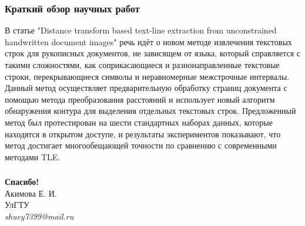 \documentclass[
	fullscreen=true, 
	bookmarks=false,
	sans serif,
	9pt,
	pdf,
	hyperref={
		pdfpagelabels=false,
		unicode=true
	}
]{beamer}
\begin{document}
	\begin{frame}[fragile]\frametitle{Краткий обзор научных работ}	
        В статье "Distance transform based text-line extraction from unconstrained handwritten document images" речь идёт о новом методе извлечения текстовых строк для рукописных документов, не зависящем от языка, который справляется с такими сложностями, как соприкасающиеся и разнонаправленные текстовые строки, перекрывающиеся символы и неравномерные межстрочные интервалы. Данный метод осуществляет предварительную обработку страниц документа с помощью метода преобразования расстояний и использует новый алгоритм обнаружения контура для выделения отдельных текстовых строк. Предложенный метод был протестирован на шести стандартных наборах данных, которые находятся в открытом доступе, и результаты экспериментов показывают, что метод достигает многообещающей точности по сравнению с современными методами TLE.
	\end{frame}

	\begin{frame}\frametitle{}
		\Large
		\center
		\textbf{Спасибо!}\\
		\vspace{1.5cm}
		\normalsize
		Акимова Е. И.\\
		УлГТУ\\
		\vspace{0.5cm}
		\textit{shuey7399@mail.ru}
	\end{frame}
	
\end{document}
